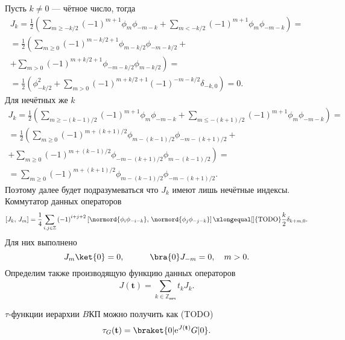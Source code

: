 \documentclass[a5paper,twoside]{article}
\begin{document}
Пусть $k\neq 0$ --- чётное число, тогда
\begin{multline*}
	J_k=\frac{1}{2} \left(\sum_{m\ge -k /2}^{} (-1)^{m+1}
	\phi_m \phi_{-m-k}+
\sum_{m<-k /2}^{} (-1)^{m+1}\phi_m \phi_{-m-k}\right)=\\=
\frac{1}{2}\left( \sum_{m\ge 0}^{} \left( -1 \right) ^{m-k /2+1}\phi_{m-k /2} \phi_{-m-k/2}\right. + \\ + \left. \sum_{m>0}^{} \left( -1 \right) ^{m+k /2+1}\phi_{-m-k /2}\phi_{m-k /2} \right) =\\=
\frac{1}{2}\left(\phi_{-k /2}^2+ \sum_{m>0}^{}\left( -1 \right) ^{m+k /2+1}\left( -1 \right) ^{-m-k /2}\delta_{-k,0}
\right) =0
.\end{multline*} 
Для нечётных же $k$
\begin{multline*}
	J_k=\frac{1}{2} \left(\sum_{m\ge -(k-1) /2}^{} (-1)^{m+1}
	\phi_m \phi_{-m-k}+
\sum_{m\le -(k+1) /2}^{} (-1)^{m+1}\phi_m \phi_{-m-k}\right)=\\=
\frac{1}{2}\left( \sum_{m\ge 0}^{} \left( -1 \right) ^{m+(k+1) /2}\phi_{m-(k-1) /2} \phi_{-m-(k+1)/2}\right. + \\ + \left. \sum_{m\ge 0}^{} \left( -1 \right) ^{m+(k-1) /2}\phi_{-m-(k+1) /2}\phi_{m-(k-1) /2} \right) =\\=
 \sum_{m\ge 0}^{}\left( -1 \right) ^{m+(k+1) /2}\phi_{m-(k-1) /2} \phi_{-m-(k+1)/2}
.\end{multline*}
Поэтому далее будет подразумеваться что $J_k$ имеют лишь нечётные индексы.
Коммутатор данных операторов
\begin{equation}
\left[ J_k,\,J_m \right] =\frac{1}{4}
\sum_{i,j \in \mathbb{Z}}^{} \left( -1 \right) ^{i+j+2}
\left[\normord{\phi_i \phi_{-i -k}},\,\normord{\phi_j \phi_{-j -k}}\right]\xlongequal[]{\text{TODO}} \frac{k}{2} \delta_{k+m,0}
.\end{equation} 
Для них выполнено
\begin{equation}
J_m  \ket{0}=0,\qquad
\quad \bra{0}J_{-m}=0,\quad m>0
.\end{equation} 
Определим также производящую функцию данных операторов
\begin{equation}
	J(\mathbf{t})= \sum_{k \in \mathbb{Z}_\text{неч}}^{} t_k J_k%
.\end{equation} 

$\tau$-функции иерархии $B$КП можно получить как (TODO)
\begin{equation}
	\tau_G(\mathbf{t})= \braket{0 | \mathrm{e} ^{J(\mathbf{t}) }G | 0}
.\end{equation} 
\end{document}
